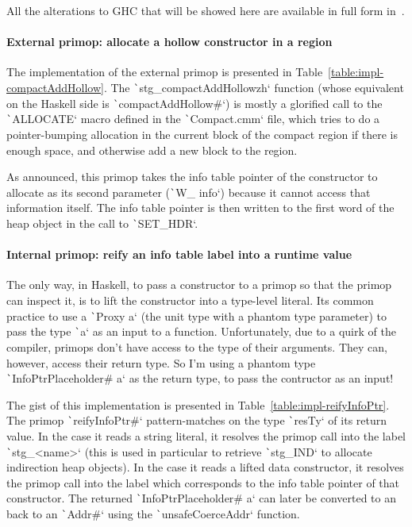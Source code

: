 \documentclass[english]{jflart}
\begin{document}
All the alterations to GHC that will be showed here are available in full form in~\cite{custom_ghc}.

\paragraph{External primop: allocate a hollow constructor in a region}

The implementation of the external primop is presented in Table~\ref{table:impl-compactAddHollow}. The \texttt`stg_compactAddHollowzh` function (whose equivalent on the Haskell side is \texttt`compactAddHollow#`) is mostly a glorified call to the \texttt`ALLOCATE` macro defined in the \texttt`Compact.cmm` file, which tries to do a pointer-bumping allocation in the current block of the compact region if there is enough space, and otherwise add a new block to the region.

As announced, this primop takes the info table pointer of the constructor to allocate as its second parameter (\texttt`W_ info`) because it cannot access that information itself. The info table pointer is then written to the first word of the heap object in the call to \texttt`SET_HDR`.

\paragraph{Internal primop: reify an info table label into a runtime value}

The only way, in Haskell, to pass a constructor to a primop so that the primop can inspect it, is to lift the constructor into a type-level literal. Its common practice to use a \texttt`Proxy a` (the unit type with a phantom type parameter) to pass the type \texttt`a` as an input to a function. Unfortunately, due to a quirk of the compiler, primops don't have access to the type of their arguments. They can, however, access their return type. So I'm using a phantom type \texttt`InfoPtrPlaceholder# a` as the return type, to pass the contructor as an input!

The gist of this implementation is presented in Table~\ref{table:impl-reifyInfoPtr}. The primop \texttt`reifyInfoPtr#` pattern-matches on the type \texttt`resTy` of its return value. In the case it reads a string literal, it resolves the primop call into the label \texttt`stg_<name>` (this is used in particular to retrieve \texttt`stg_IND` to allocate indirection heap objects). In the case it reads a lifted data constructor, it resolves the primop call into the label which corresponds to the info table pointer of that constructor. The returned \texttt`InfoPtrPlaceholder# a` can later be converted to an back to an \texttt`Addr#` using the \texttt`unsafeCoerceAddr` function.
\end{document}
